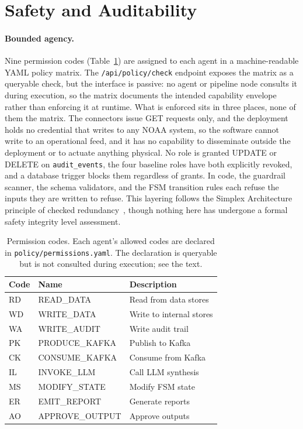 \documentclass{article}
\begin{document}
\section{Safety and Auditability}
\label{sec:safety}

\paragraph{Bounded agency.}
Nine permission codes (Table~\ref{tab:permissions}) are assigned to
each agent in a machine-readable YAML policy matrix. The
\texttt{/api/policy/check} endpoint exposes the matrix as a queryable
check, but the interface is passive: no agent or pipeline node consults
it during execution, so the matrix documents the intended capability
envelope rather than enforcing it at runtime.
What is enforced sits in three places, none of them the matrix. The
connectors issue GET requests only, and the deployment holds no
credential that writes to any NOAA system, so the software cannot
write to an operational feed, and it has no capability to disseminate
outside the deployment or to actuate anything physical. No role is
granted UPDATE or DELETE on \texttt{audit\_events}, the four baseline
roles have both explicitly revoked, and a database trigger blocks them
regardless of grants. In code, the guardrail scanner, the schema
validators, and the FSM transition rules each refuse the inputs they
are written to refuse.
This layering follows the Simplex Architecture principle of checked
redundancy~\citep{sha2001using}, though nothing here has undergone a
formal safety integrity level assessment.

\begin{table}[t]
\centering
\caption{Permission codes. Each agent's allowed codes are declared in
  \texttt{policy/permissions.yaml}. The declaration is queryable but is
  not consulted during execution; see the text.}
\label{tab:permissions}
\begin{tabular}{lll}
\toprule
Code & Name & Description \\
\midrule
RD & READ\_DATA    & Read from data stores \\
WD & WRITE\_DATA   & Write to internal stores \\
WA & WRITE\_AUDIT  & Write audit trail \\
PK & PRODUCE\_KAFKA & Publish to Kafka \\
CK & CONSUME\_KAFKA & Consume from Kafka \\
IL & INVOKE\_LLM   & Call LLM synthesis \\
MS & MODIFY\_STATE & Modify FSM state \\
ER & EMIT\_REPORT  & Generate reports \\
AO & APPROVE\_OUTPUT & Approve outputs \\
\bottomrule
\end{tabular}
\end{table}
\end{document}
